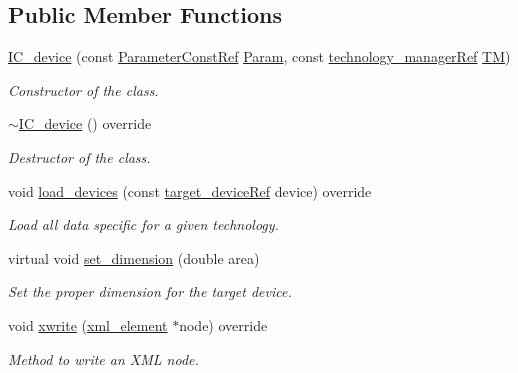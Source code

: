 \subsection*{Public Member Functions}
\begin{DoxyCompactItemize}
\item 
\hyperlink{classIC__device_a6550c4f2687612ea1e72d0be518b8bb4}{I\+C\+\_\+device} (const \hyperlink{Parameter_8hpp_a37841774a6fcb479b597fdf8955eb4ea}{Parameter\+Const\+Ref} \hyperlink{classtarget__device_a2ab6118c487cc65cf7fe3462c96967ec}{Param}, const \hyperlink{technology__manager_8hpp_a4b9ecd440c804109c962654f9227244e}{technology\+\_\+manager\+Ref} \hyperlink{classtarget__device_a941853b670a1b34eae7eab6bd21c854a}{TM})
\begin{DoxyCompactList}\small\item\em Constructor of the class. \end{DoxyCompactList}\item 
\hyperlink{classIC__device_a8593f39ee1f3004c2b512ba8ad68655d}{$\sim$\+I\+C\+\_\+device} () override
\begin{DoxyCompactList}\small\item\em Destructor of the class. \end{DoxyCompactList}\item 
void \hyperlink{classIC__device_af925283eae225d0c6deaec8a03a8ce41}{load\+\_\+devices} (const \hyperlink{target__device_8hpp_acedb2b7a617e27e6354a8049fee44eda}{target\+\_\+device\+Ref} device) override
\begin{DoxyCompactList}\small\item\em Load all data specific for a given technology. \end{DoxyCompactList}\item 
virtual void \hyperlink{classIC__device_a973f958bd8b1823f0fb4a23dbd69871e}{set\+\_\+dimension} (double area)
\begin{DoxyCompactList}\small\item\em Set the proper dimension for the target device. \end{DoxyCompactList}\item 
void \hyperlink{classIC__device_a9f1d0aed8216506d868bcab429fe9536}{xwrite} (\hyperlink{classxml__element}{xml\+\_\+element} $\ast$node) override
\begin{DoxyCompactList}\small\item\em Method to write an X\+ML node. \end{DoxyCompactList}\end{DoxyCompactItemize}
